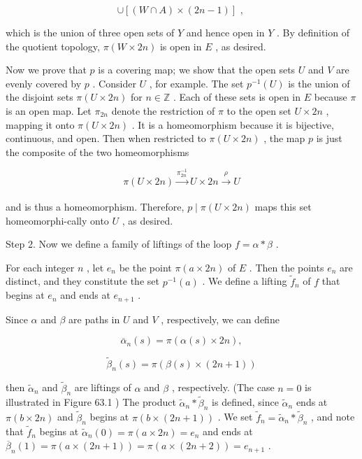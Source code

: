 \documentclass[10pt]{article}
\begin{document}
\[
\cup  \left\lbrack  {\left( {W \cap  A}\right)  \times  \left( {{2n} - 1}\right) }\right\rbrack  \text{ , }
\]

which is the union of three open sets of \(Y\) and hence open in \(Y\) . By definition of the quotient topology, \(\pi \left( {W \times  {2n}}\right)\) is open in \(E\) , as desired.

Now we prove that \(p\) is a covering map; we show that the open sets \(U\) and \(V\) are evenly covered by \(p\) . Consider \(U\) , for example. The set \({p}^{-1}\left( U\right)\) is the union of the disjoint sets \(\pi \left( {U \times  {2n}}\right)\) for \(n \in  \mathbb{Z}\) . Each of these sets is open in \(E\) because \(\pi\) is an open map. Let \({\pi }_{2n}\) denote the restriction of \(\pi\) to the open set \(U \times  {2n}\) , mapping it onto \(\pi \left( {U \times  {2n}}\right)\) . It is a homeomorphism because it is bijective, continuous, and open. Then when restricted to \(\pi \left( {U \times  {2n}}\right)\) , the map \(p\) is just the composite of the two homeomorphisms

\[
\pi \left( {U \times  {2n}}\right) \xrightarrow[]{{\pi }_{2n}^{-1}}U \times  {2n}\overset{\rho }{ \rightarrow  }U
\]

and is thus a homeomorphism. Therefore, \(p \mid  \pi \left( {U \times  {2n}}\right)\) maps this set homeomorphi-cally onto \(U\) , as desired.

Step 2. Now we define a family of liftings of the loop \(f = \alpha  * \beta\) .

For each integer \(n\) , let \({e}_{n}\) be the point \(\pi \left( {a \times  {2n}}\right)\) of \(E\) . Then the points \({e}_{n}\) are distinct, and they constitute the set \({p}^{-1}\left( a\right)\) . We define a lifting \({\widetilde{f}}_{n}\) of \(f\) that begins at \({e}_{n}\) and ends at \({e}_{n + 1}\) .

Since \(\alpha\) and \(\beta\) are paths in \(U\) and \(V\) , respectively, we can define

\[
{\overline{\alpha }}_{n}\left( s\right)  = \pi \left( {\alpha \left( s\right)  \times  {2n}}\right) ,
\]

\[
{\widetilde{\beta }}_{n}\left( s\right)  = \pi \left( {\beta \left( s\right)  \times  \left( {{2n} + 1}\right) }\right)
\]

then \({\widetilde{\alpha }}_{n}\) and \({\widetilde{\beta }}_{n}\) are liftings of \(\alpha\) and \(\beta\) , respectively. (The case \(n = 0\) is illustrated in Figure 63.1 ) The product \({\widetilde{\alpha }}_{n} * {\widetilde{\beta }}_{n}\) is defined, since \({\widetilde{\alpha }}_{n}\) ends at \(\pi \left( {b \times  {2n}}\right)\) and \({\widetilde{\beta }}_{n}\) begins at \(\pi \left( {b \times  \left( {{2n} + 1}\right) }\right)\) . We set \({\widetilde{f}}_{n} = {\widetilde{\alpha }}_{n} * {\widetilde{\beta }}_{n}\) , and note that \({\widetilde{f}}_{n}\) begins at \({\widetilde{\alpha }}_{n}\left( 0\right)  = \pi \left( {a \times  {2n}}\right)  = {e}_{n}\) and ends at \({\overline{\beta }}_{n}\left( 1\right)  = \pi \left( {a \times  \left( {{2n} + 1}\right) }\right)  = \pi \left( {a \times  \left( {{2n} + 2}\right) }\right)  = {e}_{n + 1}\) .
\end{document}

